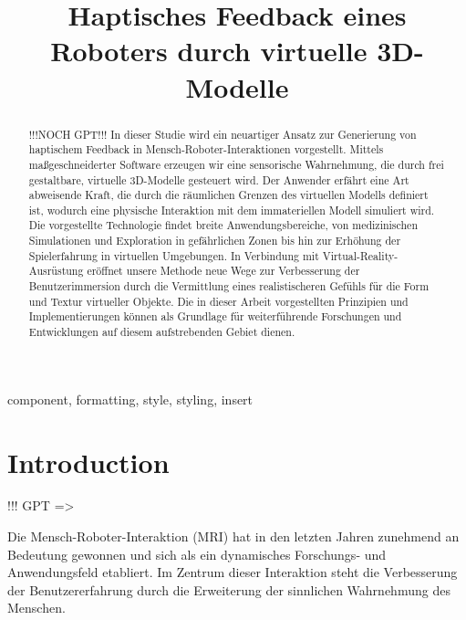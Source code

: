 \documentclass[conference]{IEEEtran}
\begin{document}
\title{Haptisches Feedback eines Roboters durch virtuelle 3D-Modelle}

\author{
    \and
}
\maketitle

\begin{abstract}
    !!!NOCH GPT!!!
    In dieser Studie wird ein neuartiger Ansatz zur Generierung von haptischem Feedback in Mensch-Roboter-Interaktionen vorgestellt. Mittels maßgeschneiderter Software erzeugen wir eine sensorische Wahrnehmung, die durch frei gestaltbare, virtuelle 3D-Modelle gesteuert wird. Der Anwender erfährt eine Art abweisende Kraft, die durch die räumlichen Grenzen des virtuellen Modells definiert ist, wodurch eine physische Interaktion mit dem immateriellen Modell simuliert wird. Die vorgestellte Technologie findet breite Anwendungsbereiche, von medizinischen Simulationen und Exploration in gefährlichen Zonen bis hin zur Erhöhung der Spielerfahrung in virtuellen Umgebungen. In Verbindung mit Virtual-Reality-Ausrüstung eröffnet unsere Methode neue Wege zur Verbesserung der Benutzerimmersion durch die Vermittlung eines realistischeren Gefühls für die Form und Textur virtueller Objekte. Die in dieser Arbeit vorgestellten Prinzipien und Implementierungen können als Grundlage für weiterführende Forschungen und Entwicklungen auf diesem aufstrebenden Gebiet dienen.
\end{abstract}

\begin{IEEEkeywords}
    component, formatting, style, styling, insert
\end{IEEEkeywords}

\section{Introduction}
!!! GPT =>

Die Mensch-Roboter-Interaktion (MRI) hat in den letzten Jahren zunehmend an Bedeutung gewonnen und sich als ein dynamisches Forschungs- und Anwendungsfeld etabliert. Im Zentrum dieser Interaktion steht die Verbesserung der Benutzererfahrung durch die Erweiterung der sinnlichen Wahrnehmung des Menschen.
\end{document}
